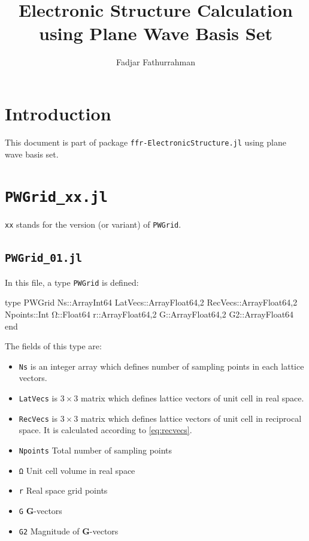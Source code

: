\documentclass[a4paper,11pt]{extarticle}
\begin{document}
\title{Electronic Structure Calculation using Plane Wave Basis Set}
\author{Fadjar Fathurrahman}
\date{}
\maketitle

\tableofcontents

\section{Introduction}

This document is part of package
{\tt ffr-ElectronicStructure.jl} using plane wave basis set.

\section{ {\tt PWGrid\_xx.jl} }

\verb|xx| stands for the version (or variant) of \verb|PWGrid|.


\subsection{ {\tt PWGrid\_01.jl} }

In this file, a type \verb|PWGrid| is defined:
\begin{juliacode}
type PWGrid
  Ns::Array{Int64}
  LatVecs::Array{Float64,2}
  RecVecs::Array{Float64,2}
  Npoints::Int
  Ω::Float64
  r::Array{Float64,2}
  G::Array{Float64,2}
  G2::Array{Float64}
end
\end{juliacode}

The fields of this type are:
\begin{itemize}

\item {\tt Ns} is an integer array which defines number of sampling points
in each lattice vectors.

\item {\tt LatVecs} is $3\times3$ matrix which defines lattice vectors of
unit cell in real space.

\item {\tt RecVecs} is $3\times3$ matrix which defines lattice vectors of
unit cell in reciprocal space. It is calculated according to \eqref{eq:recvecs}.

\item {\tt Npoints} Total number of sampling points
\item {\tt Ω} Unit cell volume in real space
\item {\tt r} Real space grid points
\item {\tt G} \textbf{G}-vectors
\item {\tt G2} Magnitude of \textbf{G}-vectors

\end{itemize}
\end{document}
